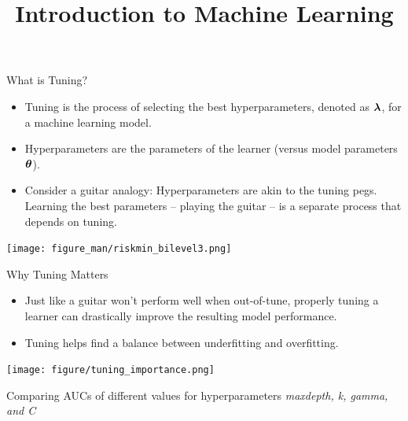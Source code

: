 \documentclass[11pt,compress,t,notes=noshow, xcolor=table]{beamer}
\title{Introduction to Machine Learning}
\begin{document}

\begin{vbframe}{What is Tuning?}
\begin{itemize}
\item \small Tuning is the process of selecting the best hyperparameters, denoted as $\bm{\lambda}$, for a machine learning model.
\item \small Hyperparameters are the parameters of the learner (versus model parameters $\bm{\theta}$).
\item \small Consider a guitar analogy: Hyperparameters are akin to the tuning pegs. Learning the best parameters \bm{$\thetavh$} -- playing the guitar -- is a separate process that depends on tuning.
\end{itemize}

\begin{center}
\texttt{[image: figure\_man/riskmin\_bilevel3.png]}
\end{center}

\end{vbframe}



\begin{vbframe}{Why Tuning Matters}
\begin{itemize}
\item \small Just like a guitar won't perform well when out-of-tune, properly tuning a learner can drastically improve the resulting model performance.
\item \small Tuning helps find a balance between underfitting and overfitting.
\end{itemize}

\begin{center}
\vspace{2em}
\texttt{[image: figure/tuning\_importance.png]}
\end{center}
\vspace{1em}
\begin{center}
\scriptsize Comparing AUCs of different values for hyperparameters \textit{maxdepth, k, gamma, and C}
\end{center}

\end{vbframe}
\end{document}
